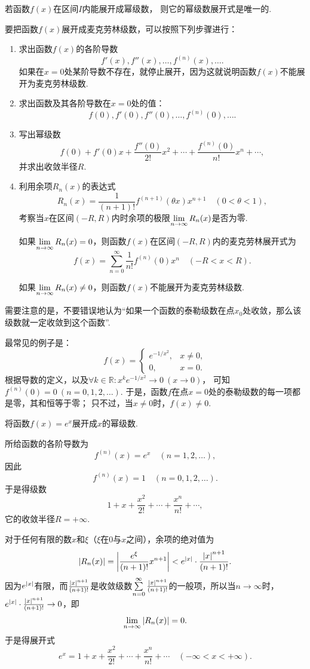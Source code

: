 \begin{theorem}
若函数\(f(x)\)在区间\(I\)内能展开成幂级数，
则它的幂级数展开式是唯一的.
\end{theorem}

{\color{red}
要把函数\(f(x)\)展开成麦克劳林级数，可以按照下列步骤进行：
\begin{enumerate}
\item 求出函数\(f(x)\)的各阶导数\[
f'(x),f''(x),\dotsc,f^{(n)}(x),\dotsc.
\]如果在\(x=0\)处某阶导数不存在，就停止展开，因为这就说明函数\(f(x)\)不能展开为麦克劳林级数.
\item 求出函数及其各阶导数在\(x=0\)处的值：\[
f(0),f'(0),f''(0),\dotsc,f^{(n)}(0),\dotsc.
\]
\item 写出幂级数\[
f(0) + f'(0) x + \frac{f''(0)}{2!} x^2 + \dotsb + \frac{f^{(n)}(0)}{n!} x^n + \dotsb,
\]并求出收敛半径\(R\).
\item 利用余项\(R_n(x)\)的表达式\[
R_n(x) = \frac{1}{(n+1)!} f^{(n+1)}(\theta x) x^{n+1}
\quad(0 < \theta < 1),
\]考察当\(x\)在区间\((-R,R)\)内时余项的极限\(\lim\limits_{n\to\infty} R_n(x)\)是否为零.

如果\(\lim\limits_{n\to\infty} R_n(x) = 0\)，则函数\(f(x)\)在区间\((-R,R)\)内的麦克劳林展开式为\[
f(x) = \sum\limits_{n=0}^\infty \frac{1}{n!} f^{(n)}(0) x^n
\quad(-R < x < R).
\]

如果\(\lim\limits_{n\to\infty} R_n(x) \neq 0\)，则函数\(f(x)\)不能展开为麦克劳林级数.
\end{enumerate}
}

需要注意的是，不要错误地认为“如果一个函数的泰勒级数在点\(x_0\)处收敛，那么该级数就一定收敛到这个函数”.
\begin{example}\label{example:无穷级数.函数的泰勒级数不一定收敛到函数}
最常见的例子是：\[
f(x) = \left\{ \begin{array}{ll}
e^{-1/x^2}, & x\neq0, \\
0, & x=0.
\end{array} \right.
\]
根据导数的定义，以及\(\forall k\in\mathbb{R}: x^k e^{-1/x^2} \to 0\ (x\to0)\)，
可知\(f^{(n)}(0) = 0\ (n=0,1,2,\dotsc)\).
于是，函数\(f\)在点\(x=0\)处的泰勒级数的每一项都是零，其和恒等于零；
只不过，当\(x\neq0\)时，\(f(x)\neq0\).
\end{example}

\begin{example}
将函数\(f(x) = e^x\)展开成\(x\)的幂级数.
\begin{solution}
所给函数的各阶导数为\[
f^{(n)}(x) = e^x
\quad(n=1,2,\dotsc),
\]因此\[
f^{(n)}(x) = 1
\quad(n=0,1,2,\dotsc).
\]于是得级数\[
1+x+\frac{x^2}{2!}+\dotsb+\frac{x^n}{n!}+\dotsb,
\]它的收敛半径\(R = +\infty\).

对于任何有限的数\(x\)和\(\xi\)（\(\xi\)在\(0\)与\(x\)之间），余项的绝对值为\[
\abs{R_n(x)} = \abs{\frac{e^{\xi}}{(n+1)!} x^{n+1}}
< e^{\abs{x}} \cdot \frac{\abs{x}^{n+1}}{(n+1)!}.
\]因为\(e^{\abs{x}}\)有限，而\(\frac{\abs{x}^{n+1}}{(n+1)!}\)是收敛级数\(\sum\limits_{n=0}^\infty \frac{\abs{x}^{n+1}}{(n+1)!}\)的一般项，所以当\(n\to\infty\)时，\(e^{\abs{x}} \cdot \frac{\abs{x}^{n+1}}{(n+1)!}\to0\)，即\[
\lim\limits_{n\to\infty} \abs{R_n(x)} = 0.
\]于是得展开式\[
e^x = 1+x+\frac{x^2}{2!}+\dotsb+\frac{x^n}{n!}+\dotsb
\quad(-\infty<x<+\infty).
\]
\end{solution}
\end{example}

